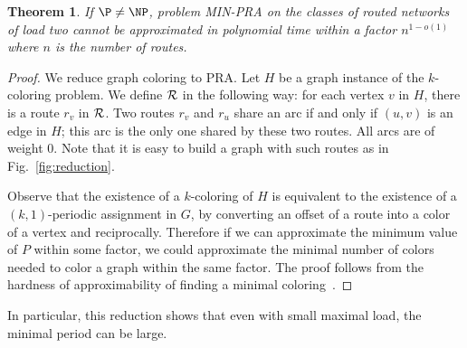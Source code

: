 \documentclass[a4paper,10pt]{article}
\newtheorem{theorem}{Theorem}
\begin{document}
\begin{theorem}\label{th:inapprox}
If $\P \neq \NP$, problem MIN-PRA on the classes of routed networks of load two cannot be approximated in polynomial time within a factor $n^{1-o(1)}$ where $n$ is the number of routes.
\end{theorem}

\begin{proof}
 We reduce graph coloring to PRA. Let $H$ be a graph instance of the $k$-coloring problem. 
 We define ${\cal R}$ in the following way: for each vertex $v$ in $H$, there is a route $r_v$ in ${\cal R}$.
 Two routes $r_v$ and $r_u$ share an arc if and only if $(u,v)$ is an edge in $H$; this arc is the only one shared by these two routes. All arcs are of weight $0$. Note that it is easy to build a graph with such routes as in Fig.~\ref{fig:reduction}.
 
 Observe that the existence of a $k$-coloring of $H$ is equivalent to the existence of a $(k,1)$-periodic assignment in $G$, 
 by converting an offset of a route into a color of a vertex and reciprocally. Therefore if we can approximate the minimum value of $P$ within some factor, we could approximate the minimal number of colors needed to color a graph within the same factor. The proof follows from the hardness of approximability of finding a minimal coloring~\cite{zuckerman2006linear}.
\end{proof}


In particular, this reduction shows that even with small maximal load, the minimal period can be large.
\end{document}
